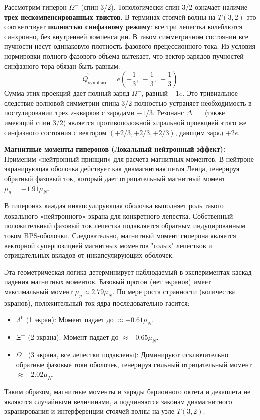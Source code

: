 \documentclass[12pt,a4paper]{article}
\begin{document}
	Рассмотрим гиперон $\Omega^-$ (спин 3/2). Топологически спин 3/2 означает наличие \textbf{трех нескомпенсированных твистов}. В терминах стоячей волны на $T(3,2)$ это соответствует \textbf{полностью синфазному режиму}: все три лепестка колеблются синхронно, без внутренней компенсации. 
	В таком симметричном состоянии все пучности несут одинаковую плотность фазового прецессионного тока. Из условия нормировки полного фазового объема вытекает, что вектор зарядов пучностей синфазного тора обязан быть равным:
	\begin{equation}
		\vec{Q}_{\text{synphase}} = e \left( -\frac{1}{3}, \ -\frac{1}{3}, \ -\frac{1}{3} \right)
	\end{equation}
	Сумма этих проекций дает полный заряд $\Omega^-$, равный $-1e$. Это тривиальное следствие волновой симметрии спина 3/2 полностью устраняет необходимость в постулировании трех $s$-кварков с зарядами $-1/3$. Резонанс $\Delta^{++}$ (также имеющий спин 3/2) является противоположной хиральной проекцией этого же синфазного состояния с вектором $(+2/3, +2/3, +2/3)$, дающим заряд $+2e$. 
	
	\textbf{Магнитные моменты гиперонов (Локальный нейтронный эффект):}
	Применим «нейтронный принцип» для расчета магнитных моментов. В нейтроне экранирующая оболочка действует как диамагнитная петля Ленца, генерируя обратный фазовый ток, который дает отрицательный магнитный момент $\mu_n = -1.91 \mu_N$. 
	
	В гиперонах каждая инкапсулирующая оболочка выполняет роль такого локального «нейтронного» экрана для конкретного лепестка. Собственный положительный фазовый ток лепестка подавляется обратным индуцированным током BPS-оболочки. 
	Следовательно, магнитный момент гиперона является векторной суперпозицией магнитных моментов "голых" лепестков и отрицательных вкладов от инкапсулирующих оболочек.
	
	Эта геометрическая логика детерминирует наблюдаемый в экспериментах каскад падения магнитных моментов. Базовый протон (нет экранов) имеет максимальный момент $\mu_p \approx 2.79 \mu_N$. 
	По мере роста странности (количества экранов), положительный ток ядра последовательно гасится:
	\begin{itemize}
		\item $\Lambda^0$ (1 экран): Момент падает до $\approx -0.61 \mu_N$.
		\item $\Xi^-$ (2 экрана): Момент падает до $\approx -0.65 \mu_N$.
		\item $\Omega^-$ (3 экрана, все лепестки подавлены): Доминируют исключительно обратные фазовые токи оболочек, генерируя сильный отрицательный момент $\approx -2.02 \mu_N$.
	\end{itemize}
	Таким образом, магнитные моменты и заряды барионного октета и декаплета не являются случайными величинами, а подчиняются законам диамагнитного экранирования и интерференции стоячей волны на узле $T(3,2)$.
	
\end{document}
